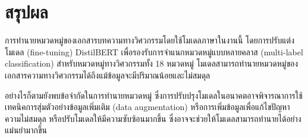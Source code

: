 \chapter{สรุปผล}

การทำนายหมวดหมู่ของเอกสารบทความทางวิศวกรรมโดยใช้โมเดลภาษาในงานนี้ โดยการปรับแต่งโมเดล (fine-tuning) DistilBERT เพื่อรองรับการจำแนกหมวดหมู่แบบหลายคลาส (multi-label classification) สำหรับหมวดหมู่ทางวิศวกรรมทั้ง 18 หมวดหมู่ โมเดลสามารถทำนายหมวดหมู่ของเอกสารความทางวิศวกรรมได้ถึงแม้ข้อมูลจะมีปริมาณน้อยและไม่สมดุล

อย่างไรก็ตามยังพบข้อจำกัดในการทำนายหมวดหมู่ ซึ่งการปรับปรุงโมเดลในอนาคตอาจพิจารณาการใช้เทคนิคการสุ่มตัวอย่างข้อมูลเพิ่มเติม (data augmentation) หรือการเพิ่มข้อมูลเพื่อแก้ไขปัญหาความไม่สมดุล หรือปรับโมเดลให้มีความซับซ้อนมากขึ้น ซึ่งอาจจะช่วยให้โมเดลสามารถทำนายได้อย่างแม่นยำมากขึ้น